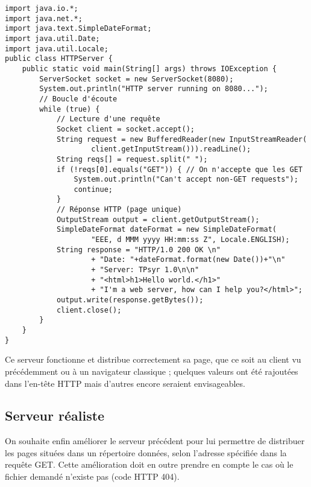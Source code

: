 \documentclass[a4paper]{article}
\begin{document}
\begin{lstlisting}
import java.io.*;
import java.net.*;
import java.text.SimpleDateFormat;
import java.util.Date;
import java.util.Locale;
public class HTTPServer {
    public static void main(String[] args) throws IOException {
        ServerSocket socket = new ServerSocket(8080);
        System.out.println("HTTP server running on 8080...");
        // Boucle d'écoute
        while (true) {
            // Lecture d'une requête
            Socket client = socket.accept();
            String request = new BufferedReader(new InputStreamReader(
            		client.getInputStream())).readLine();
            String reqs[] = request.split(" ");
            if (!reqs[0].equals("GET")) { // On n'accepte que les GET
                System.out.println("Can't accept non-GET requests");
                continue;
            }
            // Réponse HTTP (page unique)
            OutputStream output = client.getOutputStream();
            SimpleDateFormat dateFormat = new SimpleDateFormat(
            		"EEE, d MMM yyyy HH:mm:ss Z", Locale.ENGLISH);
            String response = "HTTP/1.0 200 OK \n"
                    + "Date: "+dateFormat.format(new Date())+"\n"
                    + "Server: TPsyr 1.0\n\n"
                    + "<html>h1>Hello world.</h1>"
                    + "I'm a web server, how can I help you?</html>";
            output.write(response.getBytes());
            client.close();
        }
    }
}
\end{lstlisting}

Ce serveur fonctionne et distribue correctement sa page, que ce soit au client vu précédemment ou à un navigateur classique ; quelques valeurs ont été rajoutées dans l'en-tête HTTP mais d'autres encore seraient envisageables.

\subsection{Serveur réaliste}

On souhaite enfin améliorer le serveur précédent pour lui permettre de distribuer les pages situées dans un répertoire données, selon l'adresse spécifiée dans la requête GET. Cette amélioration doit en outre prendre en compte le cas où le fichier demandé n'existe pas (code HTTP 404).
\end{document}
